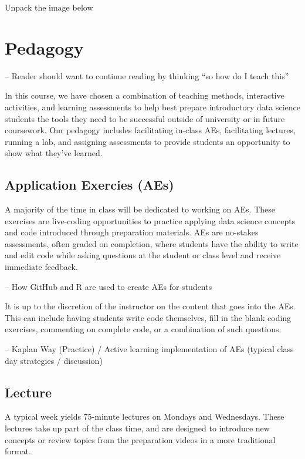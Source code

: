 \documentclass[
  12pt]{article}
\begin{document}
Unpack the image below

\hypertarget{sec-ped}{%
\section{Pedagogy}\label{sec-ped}}

-- Reader should want to continue reading by thinking ``so how do I
teach this''

In this course, we have chosen a combination of teaching methods,
interactive activities, and learning assessments to help best prepare
introductory data science students the tools they need to be successful
outside of university or in future coursework. Our pedagogy includes
facilitating in-class AEs, facilitating lectures, running a lab, and
assigning assessments to provide students an opportunity to show what
they've learned.

\hypertarget{application-exercies-aes}{%
\subsection{Application Exercies (AEs)}\label{application-exercies-aes}}

A majority of the time in class will be dedicated to working on AEs.
These exercises are live-coding opportunities to practice applying data
science concepts and code introduced through preparation materials. AEs
are no-stakes assessments, often graded on completion, where students
have the ability to write and edit code while asking questions at the
student or class level and receive immediate feedback.

-- How GitHub and R are used to create AEs for students

It is up to the discretion of the instructor on the content that goes
into the AEs. This can include having students write code themselves,
fill in the blank coding exercises, commenting on complete code, or a
combination of such questions.

-- Kaplan Way (Practice) / Active learning implementation of AEs
(typical class day strategies / discussion)

\hypertarget{lecture}{%
\subsection{Lecture}\label{lecture}}

A typical week yields 75-minute lectures on Mondays and Wednesdays.
These lectures take up part of the class time, and are designed to
introduce new concepts or review topics from the preparation videos in a
more traditional format.
\end{document}
